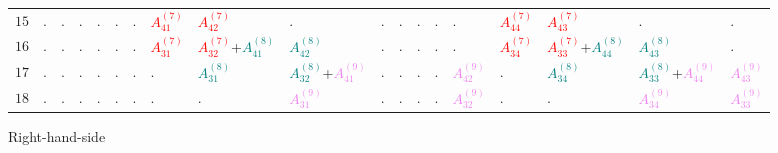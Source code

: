 \documentclass[times,namecite]{goose-article}
\begin{document}
\begin{landscape}
{\begin{tabular}{|c|C{31mm}C{31mm}C{31mm}C{31mm}C{31mm}C{31mm}C{31mm}C{31mm}C{31mm}|C{31mm}C{31mm}|C{31mm}C{31mm}C{31mm}C{31mm}C{31mm}C{31mm}C{31mm}|}
$15 $& . & . & . & . & . & . & \textcolor{red}{$A_{41}^{(7)}$} & \textcolor{red}{$A_{42}^{(7)}$} & . & . & . & . & . & . & \textcolor{red}{$A_{44}^{(7)}$} & \textcolor{red}{$A_{43}^{(7)}$} & . & . \\
$16 $& . & . & . & . & . & . & \textcolor{red}{$A_{31}^{(7)}$} & \textcolor{red}{$A_{32}^{(7)}$}+\textcolor{teal}{$A_{41}^{(8)}$} & \textcolor{teal}{$A_{42}^{(8)}$} & . & . & . & . & . & \textcolor{red}{$A_{34}^{(7)}$} & \textcolor{red}{$A_{33}^{(7)}$}+\textcolor{teal}{$A_{44}^{(8)}$} & \textcolor{teal}{$A_{43}^{(8)}$} & . \\
$17 $& . & . & . & . & . & . & . & \textcolor{teal}{$A_{31}^{(8)}$} & \textcolor{teal}{$A_{32}^{(8)}$}+\textcolor{violet}{$A_{41}^{(9)}$} & . & . & . & . & \textcolor{violet}{$A_{42}^{(9)}$} & . & \textcolor{teal}{$A_{34}^{(8)}$} & \textcolor{teal}{$A_{33}^{(8)}$}+\textcolor{violet}{$A_{44}^{(9)}$} & \textcolor{violet}{$A_{43}^{(9)}$} \\
$18 $& . & . & . & . & . & . & . & . & \textcolor{violet}{$A_{31}^{(9)}$} & . & . & . & . & \textcolor{violet}{$A_{32}^{(9)}$} & . & . & \textcolor{violet}{$A_{34}^{(9)}$} & \textcolor{violet}{$A_{33}^{(9)}$} \\ \hline
\end{tabular}
}

\begin{center}
Right-hand-side
\end{center}


\end{landscape}
\end{document}

